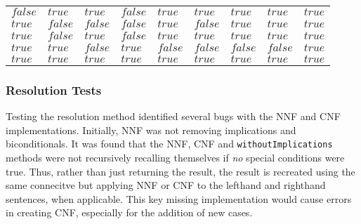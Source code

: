 \begin{sidewaystable}
\begin{tabular}{l|l|l||l|l|l|l|l|l}
    $false$                           & $true$                           & $true$                           & $false$                      & $true$                            & $true$                            & $true$                           & $true$                      & $true$                                 \\
    \underline{$true$}                & $false$                          & $false$                          & $false$                      & $true$                            & $false$                           & $true$                           & $true$                      & $true$                                 \\
    \underline{$true$}                & $false$                          & $true$                           & $false$                      & $true$                            & $true$                            & $true$                           & $true$                      & $true$                                 \\
    \underline{$true$}                & $true$                           & $false$                          & $true$                       & $false$                           & $false$                           & $false$                          & $false$                     & $true$                                 \\
    \underline{$true$}                & $true$                           & $true$                           & $true$                       & $true$                            & $true$                            & $true$                           & $true$                      & $true$                                 \\ \hline
    \end{tabular}
\end{sidewaystable}

\subsubsection{Resolution Tests}
\label{subs:Resolution Tests}

Testing the resolution method identified several bugs with the NNF and CNF implementations.
Initially, NNF was not removing implications and biconditionals. It was found that
the NNF, CNF and \texttt{withoutImplications} methods were not recursively recalling
themselves if \emph{no} special conditions were true. Thus, rather than just
returning the result, the result is recreated using the same connecitve but applying
NNF or CNF to the lefthand and righthand sentences, when applicable. This key missing
implementation would cause errors in creating CNF, especially for the addition of
new cases.

